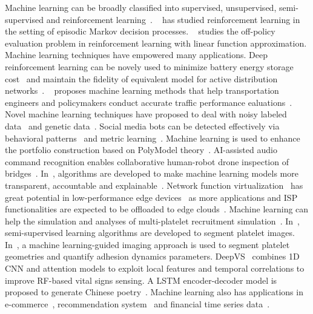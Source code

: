 Machine learning can be broadly classified into supervised, unsupervised, semi-supervised and reinforcement learning~\cite{yifei2022,yifei2022path}.
~\cite{yifei2023} has studied reinforcement learning in the setting of episodic Markov decision processes.
~\cite{yifei2021} studies the off-policy evaluation problem in reinforcement learning with linear function approximation.
Machine learning techniques have empowered many applications.
Deep reinforcement learning can be novely used to minimize battery energy storage cost~\cite{binhuang2023grid} 
and maintain the fidelity of equivalent model for active distribution networks~\cite{binhuang2023renew}.
~\cite{xiaobo_thesis} proposes machine learning methods that help transportation engineers and policymakers conduct accurate traffic performance ealuations~\cite{xiaobo2020,xiaobo2021,xiaobo2023}.
Novel machine learning techniques have proposed to deal with noisy labeled data~\cite{jinjin2023} and genetic data~\cite{jinjin_thesis}.
Social media bots can be detected effectively via behavioral patterns~\cite{wu2023botshape} and metric learning~\cite{wu2023bottrinet}.
Machine learning is used to enhance the portfolio construction based on PolyModel theory~\cite{siqiao2023}.
AI-assisted audio command recognition enables collaborative human-robot drone inspection of bridges~\cite{yuli_thesis}.
In~\cite{ziheng_thesis,ziheng2022}, algorithms are developed to make machine learning models more transparent, accountable and explainable~\cite{ziheng_relax,ziheng2023dark}.
Network function virtualization~\cite{wang2023thesis,wang2022quadrant,wang2020slos} has great potential in low-performance edge devices~\cite{wang2023scheduling}
as more applications and ISP functionalities are expected to be offloaded to edge clouds~\cite{wang2021galleon,wang2023pinolo}.
Machine learning can help the simulation and analyses of multi-platelet recruitment simulation~\cite{yicong_thesis}.
In~\cite{peineng2021,peineng2021semi}, semi-supervised learning algorithms are developed to segment platelet images.
In~\cite{peineng2023}, a machine learning-guided imaging approach is used to segment platelet geometries and quantify adhesion dynamics parameters.
DeepVS~\cite{zongxing2022dl} combines 1D CNN and attention models to exploit local features and temporal correlations to improve RF-based vital signs sensing.
A LSTM encoder-decoder model is proposed to generate Chinese poetry~\cite{yubo2017text}.
Machine learning also has applications in e-commerce~\cite{kexin2023ecommerce}, recommendation system~\cite{dong2020,dong2023,dong2023recommend} and financial time series data~\cite{kexin2023financial}.

